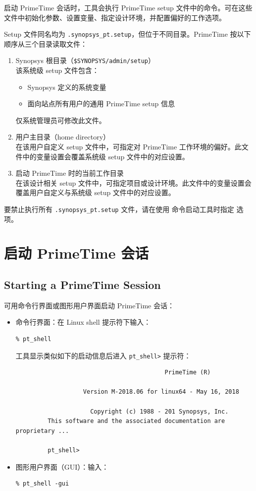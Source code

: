 启动 PrimeTime 会话时，工具会执行 PrimeTime setup 文件中的命令。可在这些文件中初始化参数、设置变量、指定设计环境，并配置偏好的工作选项。

Setup 文件同名均为 \texttt{.synopsys\_pt.setup}，但位于不同目录。PrimeTime 按以下顺序从三个目录读取文件：
\begin{enumerate}
  \item Synopsys 根目录（\texttt{\$SYNOPSYS/admin/setup}）\\
        该系统级 setup 文件包含：
  \begin{itemize}
    \item Synopsys 定义的系统变量
    \item 面向站点所有用户的通用 PrimeTime setup 信息
  \end{itemize}
        仅系统管理员可修改此文件。
  \item 用户主目录（home directory）\\
        在该用户自定义 setup 文件中，可指定对 PrimeTime 工作环境的偏好。此文件中的变量设置会覆盖系统级 setup 文件中的对应设置。
  \item 启动 PrimeTime 时的当前工作目录\\
        在该设计相关 setup 文件中，可指定项目或设计环境。此文件中的变量设置会覆盖用户自定义与系统级 setup 文件中的对应设置。
\end{enumerate}

要禁止执行所有 \texttt{.synopsys\_pt.setup} 文件，请在使用  命令启动工具时指定  选项。

\section{启动 PrimeTime 会话}
\subsection*{Starting a PrimeTime Session}

可用命令行界面或图形用户界面启动 PrimeTime 会话：
\begin{itemize}
  \item 命令行界面：在 Linux shell 提示符下输入：
\begin{lstlisting}
% pt_shell
\end{lstlisting}
        工具显示类似如下的启动信息后进入 \texttt{pt\_shell>} 提示符：
\begin{lstlisting}
                                          PrimeTime (R)

                   Version M-2018.06 for linux64 - May 16, 2018

                     Copyright (c) 1988 - 201 Synopsys, Inc.
         This software and the associated documentation are proprietary ...

         pt_shell>
\end{lstlisting}
  \item 图形用户界面（GUI）：输入：
\begin{lstlisting}
% pt_shell -gui
\end{lstlisting}
\end{itemize}

